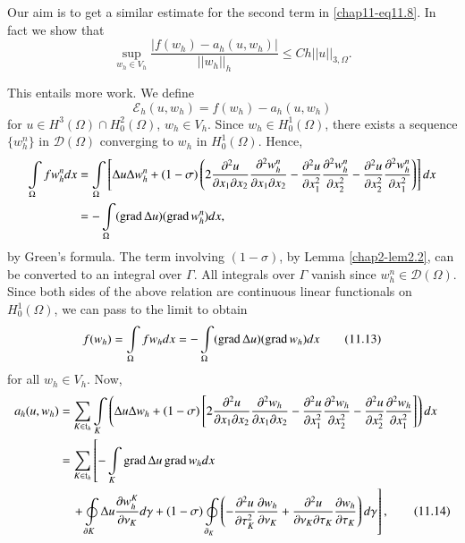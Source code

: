 Our aim is to get a similar estimate for the second term in
\eqref{chap11-eq11.8}. In fact we show that
\begin{equation*}
\sup\limits_{w_{h}\in
  V_{h}}\frac{|f(w_{h})-a_{h}(u,w_{h})|}{||w_{h}||_{h}}\leq
Ch||u||_{3,\Omega}.\tag{11.11}\label{chap11-eq11.11} 
\end{equation*}

This entails more work. We define
\begin{equation*}
\mathscr{E}_{h}(u,w_{h})=f(w_{h})-a_{h}(u,w_{h})\tag{11.12}\label{chap11-eq11.12} 
\end{equation*}
for $u\in H^{3}(\Omega)\cap H^{2}_{0}(\Omega)$, $w_{h}\in
V_{h}$. Since $w_{h}\in H^{1}_{0}(\Omega)$, there exists a sequence
$\{w^{n}_{h}\}$ in $\mathscr{D}(\Omega)$ converging to $w_{h}$ in
$H^{1}_{0}(\Omega)$. Hence,
{\fontsize{9}{11}\selectfont
\begin{align*}
\int\limits_{\Omega}fw^{n}_{h}dx &= \int\limits_{\Omega}\left[\Delta
  u\Delta w^{n}_{h}+(1-\sigma)\left(2\frac{\partial^2u}{\partial x_{1}\partial
    x_{2}}\frac{\partial^{2}w^{n}_{h}}{\partial x_{1}\partial x_{2}}-\frac{\partial^{2}u}{\partial
    x^{2}_{1}}\frac{\partial^{2}w^{n}_{h}}{\partial x^{2}_{2}}-\frac{\partial^{2}u}{\partial
    x^{2}_{2}}\frac{\partial^{2}w^{n}_{h}}{\partial x^{2}_{1}}\right)\right]dx\\
&=-\int\limits_{\Omega}(\operatorname{grad} \Delta u)(\operatorname{grad} w^{n}_{h})dx,
\end{align*}}
by Green's formula. The term involving $(1-\sigma)$, by Lemma
\ref{chap2-lem2.2}, can be converted to an integral over $\Gamma$. All
integrals over $\Gamma$ vanish since
$w^{n}_{h}\in\mathscr{D}(\Omega)$. Since both sides of the above
relation are continuous linear functionals on $H^{1}_{0}(\Omega)$, we
can pass to the limit to obtain
\begin{equation*}
f(w_{h})=\int\limits_{\Omega}fw_{h}dx=-\int\limits_{\Omega}(\operatorname{grad}
\Delta u)(\operatorname{grad} w_{h})dx\tag{11.13}\label{chap11-eq11.13}
\end{equation*}
for all $w_{h}\in V_{h}$. Now, 
{\fontsize{9}{11}\selectfont
\begin{align*}
a_{h}(u,w_{h}) &=\sum_{K\in\mathfrak{t}_{h}}\int\limits_{K}\left(\Delta
u\Delta w_{h}+(1-\sigma)\left[2\frac{\partial^{2}u}{\partial x_{1}\partial
    x_{2}}\frac{\partial^{2}w_{h}}{\partial x_{1}\partial x_{2}}-\frac{\partial^{2}u}{\partial
    x^{2}_{1}}\frac{\partial^{2}w_{h}}{\partial x^{2}_{2}}-\frac{\partial^{2}u}{\partial
    x^{2}_{2}}\frac{\partial^{2}w_{h}}{\partial x^{2}_{1}}\right]\right)dx\\
&=\sum_{K\in\mathfrak{t}_{h}}\left[-\int\limits_{K}\operatorname{grad}\Delta u\operatorname{grad}
  w_{h}dx\right.\\
&\quad \left. +\oint\limits_{\partial K} \Delta u\frac{\partial w^{K}_{h}}{\partial
    \nu_{K}}d\gamma+(1-\sigma)\oint\limits_{\partial_{K}}\left(-\frac{\partial^{2}u}{\partial
    \tau^{2}_{K}}\frac{\partial w_{h}}{\partial \nu_{K}}+\frac{\partial^{2}u}{\partial
    \nu_{K}\partial \tau_{K}}\frac{\partial w_{h}}{\partial
    \tau_{K}}\right)d\gamma\right],\tag{11.14}\label{chap11-eq11.14} 
\end{align*}}\pageoriginale
